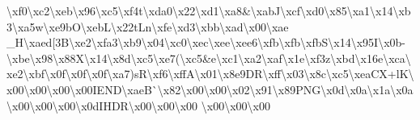 \textbackslash{}xf0\textbackslash{}xc2\textbackslash{}xeb\textbackslash{}x96\textbackslash{}xc5\textbackslash{}xf4t\textbackslash{}xda0\textbackslash{}x22\textbackslash{}xd1\textbackslash{}xa8\&\textbackslash{}xab\+J\textbackslash{}xcf\textbackslash{}xd0\textbackslash{}x85\textbackslash{}xa1\textbackslash{}x14\textbackslash{}xb3\textbackslash{}xa5w\textbackslash{}xe9b\+O\textbackslash{}xeb\+L\textbackslash{}x22t\+Ln\textbackslash{}xfe\textbackslash{}xd3\textbackslash{}xbb\textbackslash{}xad\textbackslash{}x00\textbackslash{}xae \+\_\+\+H\textbackslash{}xaed\mbox{[}3\+B\textbackslash{}xe2\textbackslash{}xfa3\textbackslash{}xb9\textbackslash{}x04\textbackslash{}xc0\textbackslash{}xec\textbackslash{}xee\textbackslash{}xee6\textbackslash{}xfb\textbackslash{}xfb\textbackslash{}xfb\+S\textbackslash{}x14\textbackslash{}x95\+I\textbackslash{}x0b-\/\textbackslash{}xbe\textbackslash{}x98\textbackslash{}x88\+X\textbackslash{}x14\textbackslash{}x8d\textbackslash{}xc5\textbackslash{}xe7(\textbackslash{}xc5\&e\textbackslash{}xc1\textbackslash{}xa2\textbackslash{}xaf\textbackslash{}x1e\textbackslash{}xf3z\textbackslash{}xbd\textbackslash{}x16e\textbackslash{}xca\textbackslash{}xe2\textbackslash{}xbf\textbackslash{}x0f\textbackslash{}x0f\textbackslash{}x0f\textbackslash{}xa7)s\+R\textbackslash{}xf6\textbackslash{}xff\+A\textbackslash{}x01\textbackslash{}x8e9\+D\+R\textbackslash{}xff\textbackslash{}x03\textbackslash{}x8c\textbackslash{}xc5\textbackslash{}xea\+C\+X+l\+K\textbackslash{}x00\textbackslash{}x00\textbackslash{}x00\textbackslash{}x00\+I\+E\+N\+D\textbackslash{}xae\+B\`{}\textbackslash{}x82\textbackslash{}x00\textbackslash{}x00\textbackslash{}x02\textbackslash{}x91\textbackslash{}x89\+P\+N\+G\textbackslash{}x0d\textbackslash{}x0a\textbackslash{}x1a\textbackslash{}x0a\textbackslash{}x00\textbackslash{}x00\textbackslash{}x00\textbackslash{}x0d\+I\+H\+D\+R\textbackslash{}x00\textbackslash{}x00\textbackslash{}x00 \textbackslash{}x00\textbackslash{}x00\textbackslash{}x00 